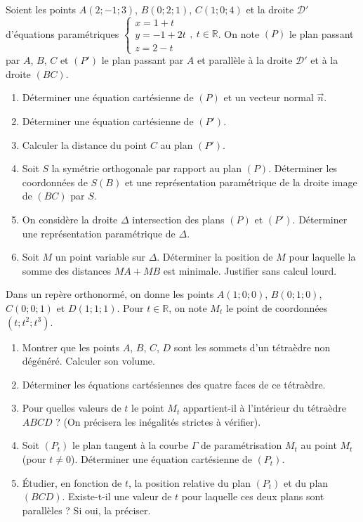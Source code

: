 \documentclass[11pt]{article}
\begin{document}
\begin{exercice}
Soient les points $A(2;-1;3)$, $B(0;2;1)$, $C(1;0;4)$ et la droite $\mathcal{D}'$ d'équations paramétriques $\begin{cases} x = 1 + t \\ y = -1 + 2t \\ z = 2 - t \end{cases},\ t \in \mathbb{R}$.
On note $(P)$ le plan passant par $A$, $B$, $C$ et $(P')$ le plan passant par $A$ et parallèle à la droite $\mathcal{D}'$ et à la droite $(BC)$.
\begin{enumerate}
    \item Déterminer une équation cartésienne de $(P)$ et un vecteur normal $\vec{n}$.
    \item Déterminer une équation cartésienne de $(P')$.
    \item Calculer la distance du point $C$ au plan $(P')$.
    \item Soit $S$ la symétrie orthogonale par rapport au plan $(P)$. Déterminer les coordonnées de $S(B)$ et une représentation paramétrique de la droite image de $(BC)$ par $S$.
    \item On considère la droite $\Delta$ intersection des plans $(P)$ et $(P')$. Déterminer une représentation paramétrique de $\Delta$.
    \item Soit $M$ un point variable sur $\Delta$. Déterminer la position de $M$ pour laquelle la somme des distances $MA + MB$ est minimale. Justifier sans calcul lourd.
\end{enumerate}
\end{exercice}

\begin{exercice}
Dans un repère orthonormé, on donne les points $A(1;0;0)$, $B(0;1;0)$, $C(0;0;1)$ et $D(1;1;1)$.
Pour $t \in \mathbb{R}$, on note $M_t$ le point de coordonnées $(t; t^2; t^3)$.
\begin{enumerate}
    \item Montrer que les points $A$, $B$, $C$, $D$ sont les sommets d'un tétraèdre non dégénéré. Calculer son volume.
    \item Déterminer les équations cartésiennes des quatre faces de ce tétraèdre.
    \item Pour quelles valeurs de $t$ le point $M_t$ appartient-il à l'intérieur du tétraèdre $ABCD$ ? (On précisera les inégalités strictes à vérifier).
    \item Soit $(P_t)$ le plan tangent à la courbe $\Gamma$ de paramétrisation $M_t$ au point $M_t$ (pour $t \neq 0$). Déterminer une équation cartésienne de $(P_t)$.
    \item Étudier, en fonction de $t$, la position relative du plan $(P_t)$ et du plan $(BCD)$. Existe-t-il une valeur de $t$ pour laquelle ces deux plans sont parallèles ? Si oui, la préciser.
\end{enumerate}
\end{exercice}
\end{document}

